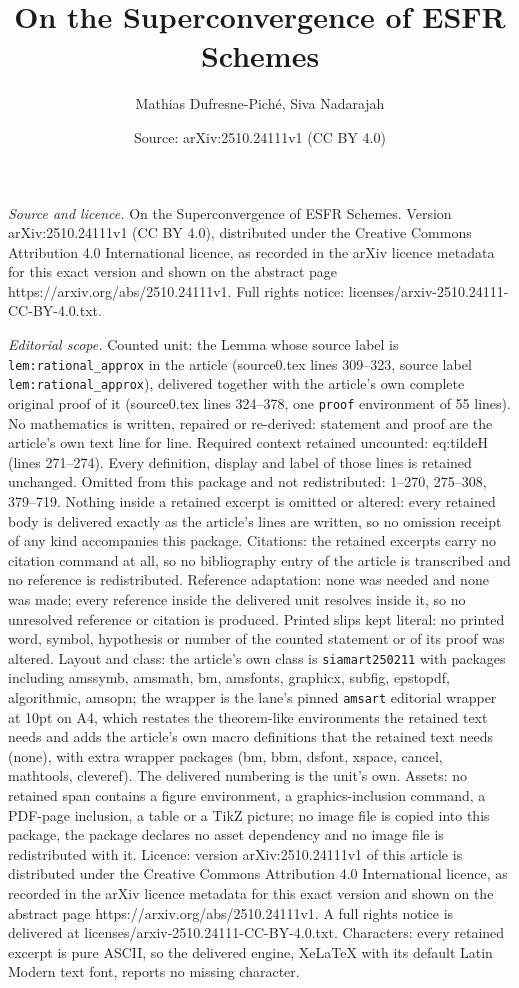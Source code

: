 \documentclass[10pt,a4paper]{amsart}
\title[On the Superconvergence of ESFR Schemes]{On the Superconvergence of ESFR Schemes}
\author{Mathias Dufresne-Pich\'e, Siva Nadarajah}
\date{Source: arXiv:2510.24111v1 (CC BY 4.0)}
\begin{document}
\maketitle

\noindent\emph{Source and licence.} On the Superconvergence of ESFR Schemes. Version arXiv:2510.24111v1 (CC BY 4.0), distributed under the Creative Commons Attribution 4.0 International licence, as recorded in the arXiv licence metadata for this exact version and shown on the abstract page https://arxiv.org/abs/2510.24111v1. Full rights notice: licenses/arxiv-2510.24111-CC-BY-4.0.txt.\par\smallskip

\noindent\textit{Editorial scope.} Counted unit: the Lemma whose source label is \texttt{lem:rational\_approx} in the article (source0.tex lines 309--323, source label \texttt{lem:rational\_approx}), delivered together with the article's own complete original proof of it (source0.tex lines 324--378, one \texttt{proof} environment of 55 lines). No mathematics is written, repaired or re-derived: statement and proof are the article's own text line for line. Required context retained uncounted: eq:tildeH (lines 271--274). Every definition, display and label of those lines is retained unchanged. Omitted from this package and not redistributed: 1--270, 275--308, 379--719. Nothing inside a retained excerpt is omitted or altered: every retained body is delivered exactly as the article's lines are written, so no omission receipt of any kind accompanies this package. Citations: the retained excerpts carry no citation command at all, so no bibliography entry of the article is transcribed and no reference is redistributed. Reference adaptation: none was needed and none was made; every reference inside the delivered unit resolves inside it, so no unresolved reference or citation is produced. Printed slips kept literal: no printed word, symbol, hypothesis or number of the counted statement or of its proof was altered. Layout and class: the article's own class is \texttt{siamart250211} with packages including amssymb, amsmath, bm, amsfonts, graphicx, subfig, epstopdf, algorithmic, amsopn; the wrapper is the lane's pinned \texttt{amsart} editorial wrapper at 10pt on A4, which restates the theorem-like environments the retained text needs and adds the article's own macro definitions that the retained text needs (none), with extra wrapper packages (bm, bbm, dsfont, xspace, cancel, mathtools, cleveref). The delivered numbering is the unit's own. Assets: no retained span contains a figure environment, a graphics-inclusion command, a PDF-page inclusion, a table or a TikZ picture; no image file is copied into this package, the package declares no asset dependency and no image file is redistributed with it. Licence: version arXiv:2510.24111v1 of this article is distributed under the Creative Commons Attribution 4.0 International licence, as recorded in the arXiv licence metadata for this exact version and shown on the abstract page https://arxiv.org/abs/2510.24111v1. A full rights notice is delivered at licenses/arxiv-2510.24111-CC-BY-4.0.txt. Characters: every retained excerpt is pure ASCII, so the delivered engine, XeLaTeX with its default Latin Modern text font, reports no missing character.
\end{document}
